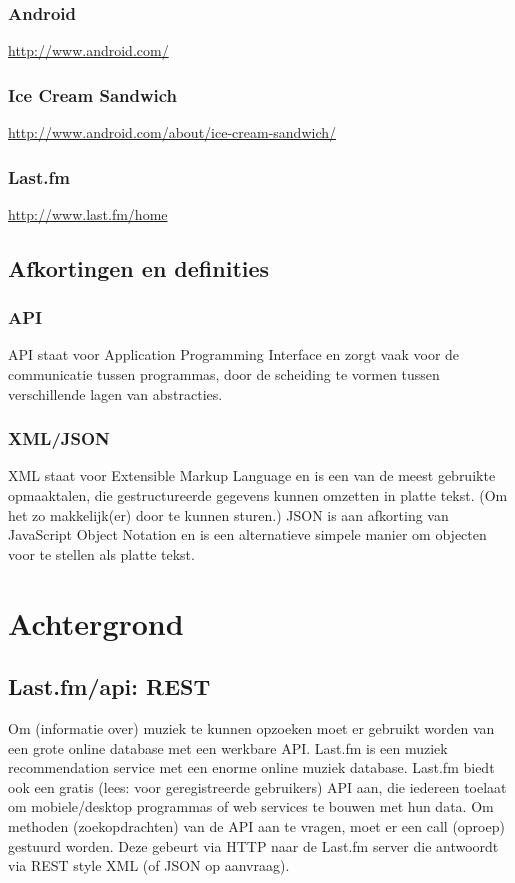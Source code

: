 \documentclass[11pt,a4paper]{article}
\begin{document}
		\subsubsection{Android}
			\url{http://www.android.com/}
		\subsubsection{Ice Cream Sandwich}
			\url{http://www.android.com/about/ice-cream-sandwich/}	
		\subsubsection{Last.fm}
			\url{http://www.last.fm/home}	

	\subsection{Afkortingen en definities}
		\subsubsection{API}
		API staat voor Application Programming Interface en zorgt vaak voor de communicatie tussen programmas, door de scheiding te vormen tussen verschillende lagen van abstracties.
		\subsubsection{XML/JSON}
		XML staat voor Extensible Markup Language en is een van de meest gebruikte opmaaktalen, die gestructureerde gegevens kunnen omzetten in platte tekst. (Om het zo makkelijk(er) door te kunnen sturen.)
		\newline
		JSON is aan afkorting van JavaScript Object Notation en is een alternatieve simpele manier om objecten voor te stellen als platte tekst.

\section{Achtergrond}
	\subsection{Last.fm/api: REST}
Om (informatie over) muziek te kunnen opzoeken moet er gebruikt worden van een grote online database met een werkbare API. Last.fm is een muziek recommendation service met een enorme online muziek database. Last.fm biedt ook een gratis (lees: voor geregistreerde gebruikers) API aan, die iedereen toelaat om mobiele/desktop programmas of web services te bouwen met hun data.
\newline
Om methoden (zoekopdrachten) van de API aan te vragen, moet er een call (oproep) gestuurd worden. Deze gebeurt via HTTP naar de Last.fm server die antwoordt via REST style XML (of JSON op aanvraag).
\end{document}
